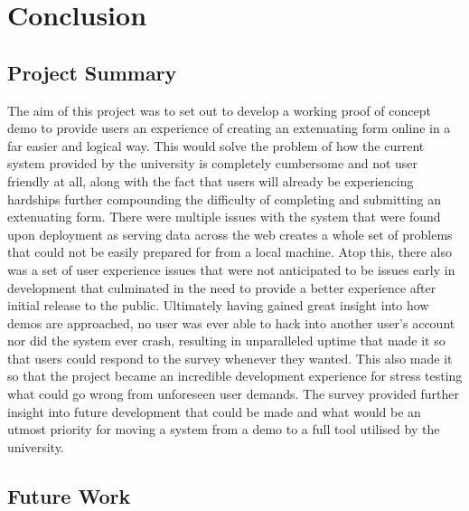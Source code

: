 \chapter{Conclusion}

\section{Project Summary}

The aim of this project was to set out to develop a working proof of concept demo to provide users an experience of creating an extenuating form online in a far easier and logical way. This would solve the problem of how the current system provided by the university is completely cumbersome and not user friendly at all, along with the fact that users will already be experiencing hardships further compounding the difficulty of completing and submitting an extenuating form.
\newline
\newline
There were multiple issues with the system that were found upon deployment as serving data across the web creates a whole set of problems that could not be easily prepared for from a local machine. Atop this, there also was a set of user experience issues that were not anticipated to be issues early in development that culminated in the need to provide a better experience after initial release to the public. Ultimately having gained great insight into how demos are approached, no user was ever able to hack into another user’s account nor did the system ever crash, resulting in unparalleled uptime that made it so that users could respond to the survey whenever they wanted. This also made it so that the project became an incredible development experience for stress testing what could go wrong from unforeseen user demands. The survey provided further insight into future development that could be made and what would be an utmost priority for moving a system from a demo to a full tool utilised by the university.

\section{Future Work}

